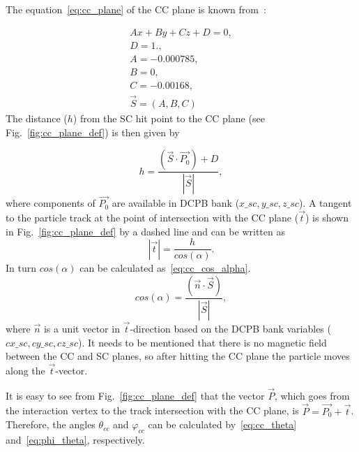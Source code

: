  
The equation~\ref{eq:cc_plane} of the CC plane is known from~\cite{Osipenko:2004}: 

\begin{equation}
\begin{aligned}
 Ax+By+Cz+D = 0,  \\ \label{eq:cc_plane}
  D=1.,  \\ 
  A=-0.000785, \\ 
  B=0,  \\
  C=-0.00168, \\
  \overrightarrow{S} = (A,B,C)
\end{aligned}  
\end{equation}
The distance ($h$) from the SC hit point to the CC plane (see Fig.~\ref{fig:cc_plane_def}) is then given by

\begin{equation}
h=\frac{(\overrightarrow{S} \cdot \overrightarrow{P_{0}})+D}{\left |\overrightarrow{S}  \right |},
\label{eq:cc_h_distance}
\end{equation}
where components of $\overrightarrow{P_{0}}$ are available in  DCPB bank ($x\_sc, y\_sc, z\_sc$). 
 A tangent to the particle track at the point of intersection with the CC plane ($ \vec t$) is shown in Fig.~\ref{fig:cc_plane_def} by a dashed line and can be written as 
\begin{equation}
\left | \overrightarrow{t} \right |=\frac{h}{cos(\alpha )}.
\label{eq:cc_t_vec} 
\end{equation}
In turn $cos(\alpha )$ can be calculated as~\ref{eq:cc_cos_alpha}.
\begin{equation}
cos(\alpha )=\frac{(\overrightarrow{n} \cdot \overrightarrow{S})}{\left | \overrightarrow{S} \right |},
\label{eq:cc_cos_alpha} 
\end{equation}
 where $ \vec n$ is a unit vector in $ \vec t$-direction based on the DCPB bank variables ($cx\_sc, cy\_sc, cz\_sc$). It needs to be mentioned that there is no magnetic field between the CC and SC planes, so after hitting the CC plane the particle moves along the $ \vec t$-vector.






It is easy to see from  Fig.~\ref{fig:cc_plane_def} that the vector $\overrightarrow{P}$, which goes from the  interaction vertex to the track intersection with the CC plane, is $\overrightarrow{P}=\overrightarrow{P_{0}}+\overrightarrow{t}$. Therefore, the angles $\theta_{cc}$ and $\varphi_{cc}$ can be calculated by~\ref{eq:cc_theta} and~\ref{eq:phi_theta}, respectively.


